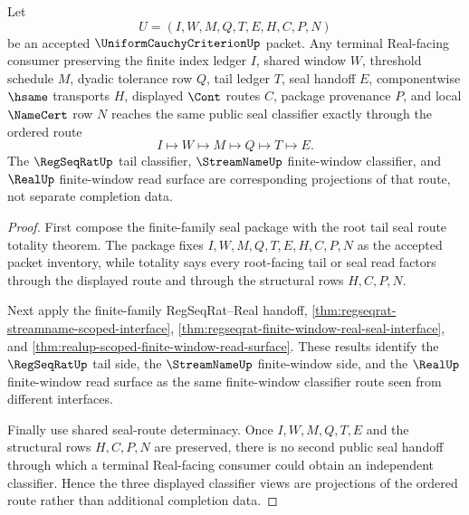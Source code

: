 \begin{theorem}
\label{thm:uniform-cauchy-criterion-terminal-seal-classifier-route}
Let
$$
U=(I,W,M,Q,T,E,H,C,P,N)
$$
be an accepted $\UniformCauchyCriterionUp$ packet. Any terminal Real-facing consumer preserving the finite index ledger $I$, shared window $W$, threshold schedule $M$, dyadic tolerance row $Q$, tail ledger $T$, seal handoff $E$, componentwise $\hsame$ transports $H$, displayed $\Cont$ routes $C$, package provenance $P$, and local $\NameCert$ row $N$ reaches the same public seal classifier exactly through the ordered route
$$
I \longmapsto W \longmapsto M \longmapsto Q \longmapsto T \longmapsto E.
$$
The $\RegSeqRatUp$ tail classifier, $\StreamNameUp$ finite-window classifier, and $\RealUp$ finite-window read surface are corresponding projections of that route, not separate completion data.
\end{theorem}
\begin{proof}
First compose the finite-family seal package with the root tail seal route totality theorem. The package fixes $I,W,M,Q,T,E,H,C,P,N$ as the accepted packet inventory, while totality says every root-facing tail or seal read factors through the displayed route and through the structural rows $H,C,P,N$.

Next apply the finite-family RegSeqRat--Real handoff, \autoref{thm:regseqrat-streamname-scoped-interface}, \autoref{thm:regseqrat-finite-window-real-seal-interface}, and \autoref{thm:realup-scoped-finite-window-read-surface}. These results identify the $\RegSeqRatUp$ tail side, the $\StreamNameUp$ finite-window side, and the $\RealUp$ finite-window read surface as the same finite-window classifier route seen from different interfaces.

Finally use shared seal-route determinacy. Once $I,W,M,Q,T,E$ and the structural rows $H,C,P,N$ are preserved, there is no second public seal handoff through which a terminal Real-facing consumer could obtain an independent classifier. Hence the three displayed classifier views are projections of the ordered route rather than additional completion data.
\end{proof}

